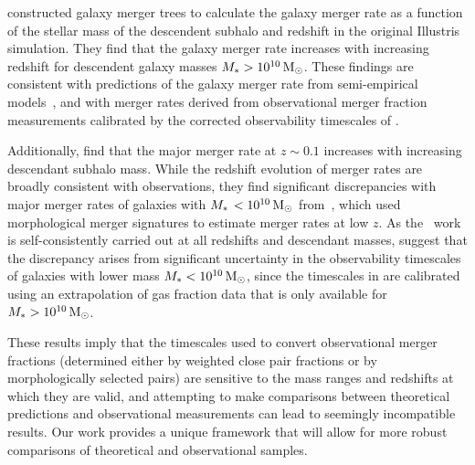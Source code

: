 \documentclass[twocolumn,linenumbers]{aastex631}
\begin{document}
                       
            \citet{RG2015} constructed galaxy merger trees to calculate the galaxy merger rate as a function of the stellar mass of the descendent subhalo and redshift in the original Illustris simulation. 
            They find that the galaxy merger rate increases with increasing redshift for descendent galaxy masses $M_{*{}}>10^{10}\,\mathrm{M}_\odot$. 
            These findings are consistent with predictions of the galaxy merger rate from semi-empirical models~\citep{Stewart2009,Hopkins2010a}, and with merger rates derived from observational merger fraction measurements calibrated by the corrected observability timescales of \citet{Lotz2011}.
            
            Additionally, \citet{RG2015} find that the major merger rate at $z\sim0.1$ increases with increasing descendant subhalo mass.
            While the redshift evolution of merger rates are broadly consistent with observations, they find significant discrepancies with major merger rates of galaxies with $M_{*{\,}} <10^{10}\,\mathrm{M}_\odot$ from~\citet{Casteels2014}, which used morphological merger signatures to estimate merger rates at low $z$. 
            As the~\citet{RG2015} work is self-consistently carried out at all redshifts and descendant masses, \citet{RG2015} suggest that the discrepancy arises from significant uncertainty in the observability timescales of galaxies with lower mass $M_{*{}}<10^{10}\,\mathrm{M}_\odot$, since the timescales in \citet{Casteels2014} are calibrated using an extrapolation of gas fraction data that is only available for $M_{*{}}>10^{10}\,\mathrm{M}_\odot$. 
            
            These results imply that the timescales used to convert observational merger fractions (determined either by weighted close pair fractions or by morphologically selected pairs) are sensitive to the mass ranges and redshifts at which they are valid, and attempting to make comparisons between theoretical predictions and observational measurements can lead to seemingly incompatible results. 
            Our work provides a unique framework that will allow for more robust comparisons of theoretical and observational samples. 
\end{document}
